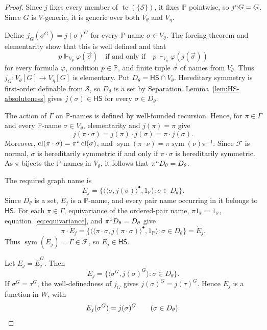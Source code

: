 \documentclass[11pt,a4paper]{amsart}
\newcommand{\HS}{\mathsf{HS}}
\newcommand{\sym}{\operatorname{sym}}
\newcommand{\tc}{\operatorname{tc}}
\theoremstyle{plain}
\theoremstyle{definition}
\theoremstyle{remark}
\begin{document}
\begin{proof}
Since $j$ fixes every member of $\tc(\{\mathscr S\})$, it fixes $\mathbb P$ pointwise, so $j``G=G$.  Since $G$ is $V$-generic, it is generic over both $V_\theta$ and $V_\eta$.

{Define $j_G(\sigma^G)=j(\sigma)^G$ for every $\mathbb P$-name $\sigma\in V_\theta$.  The forcing theorem and elementarity show that this is well defined and that}
\[
p\Vdash_{V_\theta}\varphi(\vec\sigma)
\quad\text{if and only if}\quad
p\Vdash_{V_\eta}\varphi(j(\vec\sigma))
\]
{for every formula $\varphi$, condition $p\in\mathbb P$, and finite tuple $\vec\sigma$ of names from $V_\theta$.  Thus $j_G:V_\theta[G]\to V_\eta[G]$ is elementary.}
Put $D_\theta=\HS\cap V_\theta$.  Hereditary symmetry is first-order definable from $\mathscr S$, so $D_\theta$ is a set by Separation.  Lemma~\ref{lem:HS-absoluteness} gives $j(\sigma)\in\HS$ for every $\sigma\in D_\theta$.

The action of $\Gamma$ on $\mathbb P$-names is defined by well-founded recursion.  Hence, for $\pi\in\Gamma$ and every $\mathbb P$-name $\sigma\in V_\theta$, elementarity and $j(\pi)=\pi$ give
\begin{equation}\label{eq:equivariance}
j(\pi\cdot\sigma)
=j(\pi)\cdot j(\sigma)
=\pi\cdot j(\sigma).
\end{equation}
Moreover, $\operatorname{cl}(\pi\cdot\sigma)=\pi``\operatorname{cl}(\sigma)$, and $\sym(\pi\cdot\nu)=\pi\sym(\nu)\pi^{-1}$.  Since $\mathcal F$ is normal, $\sigma$ is hereditarily symmetric if and only if $\pi\cdot\sigma$ is hereditarily symmetric.  As $\pi$ bijects the $\mathbb P$-names in $V_\theta$, it follows that $\pi``D_\theta=D_\theta$.

The required graph name is
\[
\dot E_j=\bigl\{\langle\langle\sigma,j(\sigma)\rangle^\bullet,1_{\mathbb P}\rangle:\sigma\in D_\theta\bigr\}.
\]
Since $D_\theta$ is a set, $\dot E_j$ is a $\mathbb P$-name, and every pair name occurring in it belongs to $\HS$.  For each $\pi\in\Gamma$, equivariance of the ordered-pair name, $\pi 1_{\mathbb P}=1_{\mathbb P}$, equation~\eqref{eq:equivariance}, and $\pi``D_\theta=D_\theta$ give
\[
\pi\cdot\dot E_j
 =\bigl\{\langle\langle\pi\cdot\sigma,j(\pi\cdot\sigma)\rangle^\bullet,1_{\mathbb P}\rangle:\sigma\in D_\theta\bigr\}
 =\dot E_j.
\]
Thus $\sym(\dot E_j)=\Gamma\in\mathcal F$, so $\dot E_j\in\HS$.

Let $E_j=\dot E_j^G$.  Then
\[
E_j=\bigl\{\langle\sigma^G,j(\sigma)^G\rangle:\sigma\in D_\theta\bigr\}.
\]
If $\sigma^G=\tau^G$, the well-definedness of $j_G$ gives $j(\sigma)^G=j(\tau)^G$.  Hence $E_j$ is a function in $W$, with
\[
E_j(\sigma^G)=j(\sigma)^G
\qquad
(\sigma\in D_\theta).\qedhere
\]
\end{proof}
\end{document}
